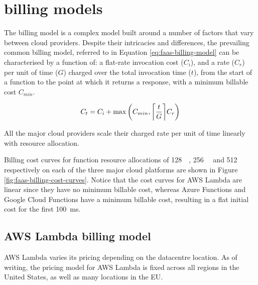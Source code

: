 \section{\faas{} billing models}
\label{sec:faas-billing-models}

The \faas{} billing model is a complex model built around a number of factors that vary between cloud providers. Despite their intricacies and differences, the prevailing common billing model, referred to in Equation \ref{eq:faas-billing-model} can be characterised by a function of: a flat-rate invocation cost ($C_i$), and a rate ($C_r$) per unit of time ($G$) charged over the total invocation time ($t$), from the start of a function to the point at which it returns a response, with a minimum billable cost $C_{min}$.

\begin{equation} \label{eq:faas-billing-model}
C_t = C_i + \max\left(C_{min},\ceil*{\frac{t}{G}} C_r\right)
\end{equation}

All the major cloud providers scale their charged rate per unit of time linearly with resource allocation.

Billing cost curves for function resource allocations of \SI{128}{\mega\byte}, \SI{256}{\mega\byte} and \SI{512}{\mega\byte} respectively on each of the three major cloud platforms are shown in Figure \ref{fig:faas-billing-cost-curves}. Notice that the cost curves for AWS Lambda are linear since they have no minimum billable cost, whereas Azure Functions and Google Cloud Functions have a minimum billable cost, resulting in a flat initial cost for the first \SI{100}{\milli\second}.

\begin{figure*}[htp]
    \centering
    \quad
    \quad
    \caption{\faas{} billing cost curves by cloud provider}
    \label{fig:faas-billing-cost-curves}
\end{figure*}

\subsection{AWS Lambda billing model}
AWS Lambda varies its pricing depending on the datacentre location. As of writing, the pricing model for AWS Lambda is fixed across all regions in the United States, as well as many locations in the EU\cite{ServerlessComputingAWS}.

